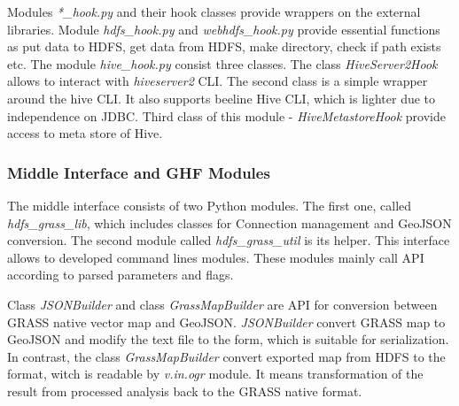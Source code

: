 \documentclass[a4paper,12pt,oneside]{report}
\begin{document}
	Modules \textit{*\_hook.py} and their hook classes provide wrappers on the
	external libraries. Module \textit{hdfs\_hook.py} and \textit{webhdfs\_hook.py}
	provide essential functions as put data to HDFS, get data from HDFS, make
	directory, check if path exists etc. 
	The module \textit{ hive\_hook.py} consist three classes. The class
	\textit{HiveServer2Hook} allows to interact with \textit{hiveserver2} CLI. The
	second class is a simple wrapper around the hive CLI. It also supports beeline
	Hive CLI, which is lighter due to independence on JDBC. Third class of this
	module -  \textit{HiveMetastoreHook} provide access to meta store of Hive. 
	
	\subsubsection{Middle Interface and GHF Modules}
	The middle interface consists of two Python modules. The first one, called
	\textit{hdfs\_grass\_lib}, which includes classes for Connection management
	and GeoJSON conversion.  The second module called \textit{hdfs\_grass\_util}
	is its helper. This interface allows to developed command lines
	modules. These modules mainly call API according to parsed parameters and flags.  
	
	Class \textit{JSONBuilder} and class \textit{GrassMapBuilder} are API for
	conversion between GRASS native vector map and GeoJSON.  \textit{JSONBuilder}
	convert GRASS map to GeoJSON and modify the text file to the form, which is
	suitable for serialization. In contrast, the class \textit{GrassMapBuilder}
	convert exported map from HDFS to the format, witch is readable by
	\textit{v.in.ogr} module. It means transformation of the result from processed analysis back
	to the GRASS native format.
	
\end{document}

